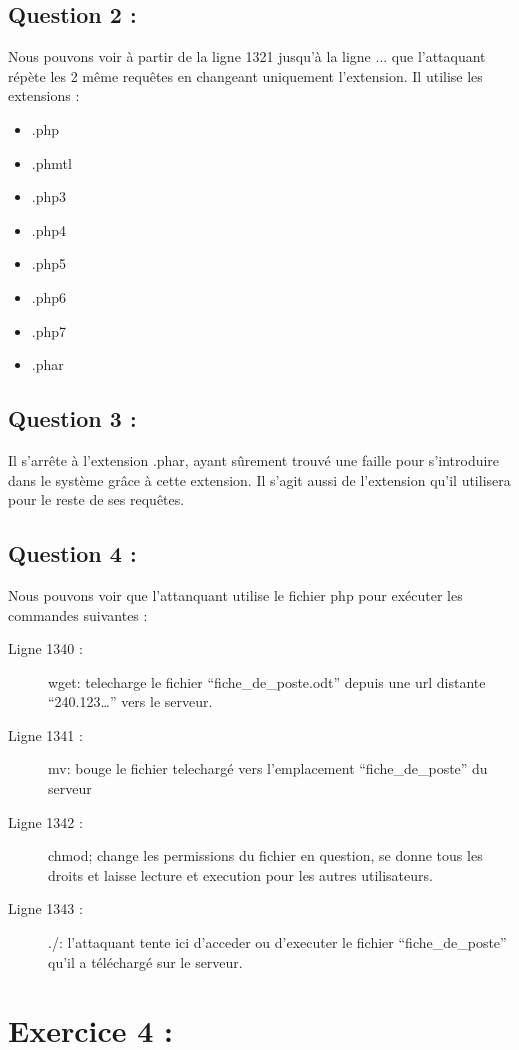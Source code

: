 \documentclass{article}
\begin{document}
    \subsection{Question 2 :}
        Nous pouvons voir à partir de la ligne 1321 jusqu'à la ligne ... que l'attaquant répète les 2 même requêtes en changeant uniquement l'extension.
        Il utilise les extensions :
        \begin{itemize}
            \item .php
            \item .phmtl
            \item .php3
            \item .php4
            \item .php5
            \item .php6
            \item .php7
            \item .phar
        \end{itemize}
    \subsection{Question 3 :}
        Il s'arrête à l'extension .phar, ayant sûrement trouvé une faille pour s'introduire dans le système grâce à cette extension.
        Il s'agit aussi de l'extension qu'il utilisera pour le reste de ses requêtes.
    \subsection{Question 4 :}
        Nous pouvons voir que l'attanquant utilise le fichier php pour exécuter les commandes suivantes :
        \begin{description}
            \item[Ligne 1340 :] wget: telecharge le fichier “fiche\_de\_poste.odt” depuis une url distante “240.123…” vers le serveur.
            \item[Ligne 1341 :] mv: bouge le fichier telechargé vers l’emplacement “fiche\_de\_poste” du serveur
            \item[Ligne 1342 :] chmod; change les permissions du fichier en question, se donne tous les droits et laisse lecture et execution pour les autres utilisateurs.
            \item[Ligne 1343 :] ./: l’attaquant tente ici d’acceder ou d’executer le fichier “fiche\_de\_poste” qu’il a téléchargé sur le serveur.
        \end{description}
\section{Exercice 4 :}
\end{document}
